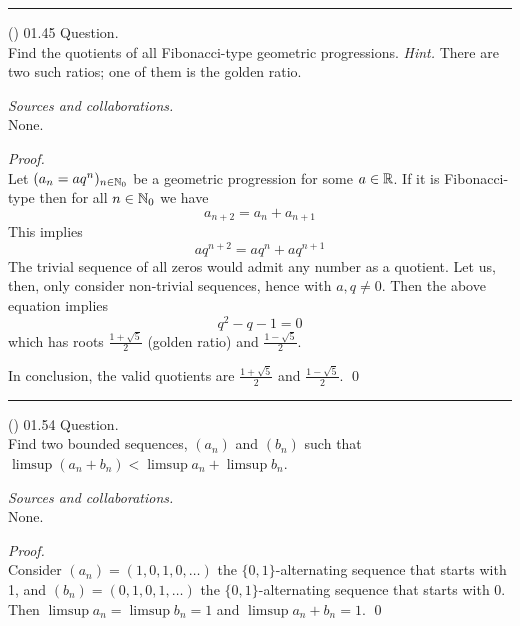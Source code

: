 \documentclass{amsart}
\begin{document}
\bigskip\hrule

\vspace{0.5cm}

\newpage
\Large
{}

\noindent
(\done) 01.45 Question. \\
Find the quotients of all Fibonacci-type geometric progressions. \textit{Hint.} There are two such ratios; one of them is the golden ratio.

\medskip\noindent
\emph{Sources and collaborations.}\\
None.

\medskip\noindent
\emph{Proof.}\\
Let $(a_n = aq^n)_{n \in \mathbb{N}_0}$ be a geometric progression for some $a \in \mathbb{R}$. If it is Fibonacci-type then for all $n \in \mathbb{N}_0$ we have \begin{equation*}
a_{n + 2} = a_n + a_{n+1}
\end{equation*}
This implies \begin{equation*}
aq^{n+2} = aq^n + aq^{n+1}
\end{equation*}
The trivial sequence of all zeros would admit any number as a quotient. Let us, then, only consider non-trivial sequences, hence with $a, q \neq 0$. Then the above equation implies \begin{equation*}
q^2 - q - 1 = 0
\end{equation*}
which has roots $\frac{1 + \sqrt{5}}{2}$ (golden ratio) and $\frac{1 - \sqrt{5}}{2}$.

In conclusion, the valid quotients are $\frac{1 + \sqrt{5}}{2}$ and $\frac{1 - \sqrt{5}}{2}$. \qed

\bigskip\hrule

\vspace{0.5cm}

\newpage
\Large
{}

\noindent
(\done) 01.54 Question. \\
Find two bounded sequences, $(a_n)$ and $(b_n)$ such that $\limsup (a_n + b_n) < \limsup a_n + \limsup b_n$.

\medskip\noindent
\emph{Sources and collaborations.}\\
None.

\medskip\noindent
\emph{Proof.}\\
Consider $(a_n) = (1, 0, 1, 0, \ldots)$ the $\{0, 1\}$-alternating sequence that starts with 1, and $(b_n) = (0, 1, 0, 1, \ldots)$ the $\{0, 1\}$-alternating sequence that starts with 0. Then $\limsup a_n = \limsup b_n = 1$ and $\limsup a_n + b_n = 1$.
\qed
\end{document}
